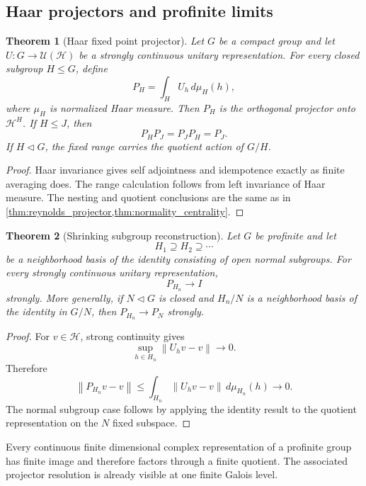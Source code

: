 \documentclass{aomart}
\newtheorem{theorem}{Theorem}[section]
\theoremstyle{definition}
\theoremstyle{remark}
\newcommand{\Hh}{\mathcal H}
\newcommand{\norm}[1]{\left\lVert#1\right\rVert}
\begin{document}
\subsection{Haar projectors and profinite limits}

\begin{theorem}[Haar fixed point projector]\label{thm:haar_projector}
Let \(G\) be a compact group and let \(U:G\to\mathcal U(\Hh)\) be a strongly continuous unitary representation. For every closed subgroup \(H\leq G\), define
\[
 \boxed{
 P_H
 =
 \int_HU_h\,d\mu_H(h),
 }
\]
where \(\mu_H\) is normalized Haar measure. Then \(P_H\) is the orthogonal projector onto \(\Hh^H\). If \(H\leq J\), then
\[
 P_HP_J=P_JP_H=P_J.
\]
If \(H\triangleleft G\), the fixed range carries the quotient action of \(G/H\).
\end{theorem}

\begin{proof}
Haar invariance gives self adjointness and idempotence exactly as finite averaging does. The range calculation follows from left invariance of Haar measure. The nesting and quotient conclusions are the same as in \cref{thm:reynolds_projector,thm:normality_centrality}.
\end{proof}

\begin{theorem}[Shrinking subgroup reconstruction]\label{thm:shrinking_subgroup_reconstruction}
Let \(G\) be profinite and let
\[
 H_1\supseteq H_2\supseteq\cdots
\]
be a neighborhood basis of the identity consisting of open normal subgroups. For every strongly continuous unitary representation,
\[
 \boxed{
 P_{H_n}\longrightarrow I
 }
\]
strongly. More generally, if \(N\triangleleft G\) is closed and \(H_n/N\) is a neighborhood basis of the identity in \(G/N\), then \(P_{H_n}\to P_N\) strongly.
\end{theorem}

\begin{proof}
For \(v\in\Hh\), strong continuity gives
\[
 \sup_{h\in H_n}\norm{U_hv-v}\longrightarrow0.
\]
Therefore
\[
 \norm{P_{H_n}v-v}
 \leq
 \int_{H_n}\norm{U_hv-v}\,d\mu_{H_n}(h)
 \longrightarrow0.
\]
The normal subgroup case follows by applying the identity result to the quotient representation on the \(N\) fixed subspace.
\end{proof}

\begin{corollary}\label{cor:finite_quotient_factorization}
Every continuous finite dimensional complex representation of a profinite group has finite image and therefore factors through a finite quotient. The associated projector resolution is already visible at one finite Galois level.
\end{corollary}
\end{document}
